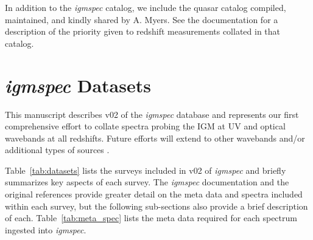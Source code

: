 \documentclass[12pt]{elsarticle}
\begin{document}
In addition to the {\it igmspec} catalog, we include the quasar
catalog compiled, maintained, and kindly shared by A. Myers.
See the documentation for a description of the priority given to 
redshift measurements collated in that catalog.


\section{{\it igmspec} Datasets}
\label{sec:datasets}

This manuscript describes v02 of the {\it igmspec}
database and represents our first comprehensive effort to collate
spectra probing the IGM at UV and optical wavebands at all
redshifts.  Future efforts will extend to other wavebands and/or
additional types of sources 
\citep[e.g. star-forming galaxies;][]{rubin+14,rubin+16}.

Table~\ref{tab:datasets} lists the surveys included in
v02 of {\it igmspec} and briefly summarizes key aspects
of each survey.  The {\it igmspec} documentation and 
the original references provide greater detail on the meta data
and spectra included within each survey, but the following
sub-sections also provide a brief description of each.
Table~\ref{tab:meta_spec} lists the meta data required
for each spectrum ingested into {\it igmspec}.


\end{document}
